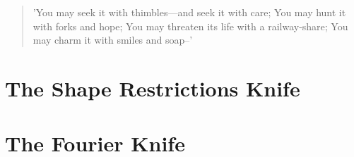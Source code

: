 \begin{quote}'You may seek it with thimbles—and seek it with care;
   You may hunt it with forks and hope;
You may threaten its life with a railway-share;
   You may charm it with smiles and soap--'
   \end{quote}

\section{The Shape Restrictions Knife}
\section{The Fourier Knife}
